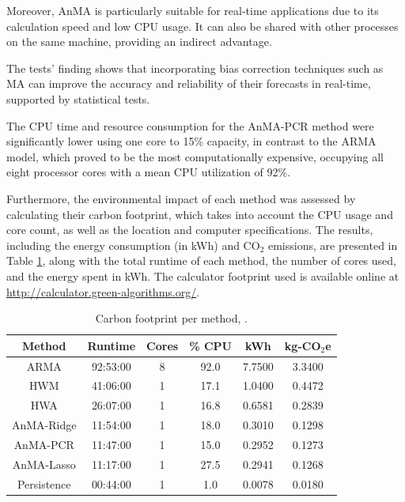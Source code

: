 Moreover, AnMA is particularly suitable for real-time applications due to its calculation speed and low CPU usage. It can also be shared with other processes on the same machine, providing an indirect advantage.

The tests' finding shows that incorporating bias correction techniques such as MA can improve the accuracy and reliability of their forecasts in real-time, supported by statistical tests.

The CPU time and resource consumption for the AnMA-PCR method were significantly lower using one core to 15\% capacity, in contrast to the ARMA model, which proved to be the most computationally expensive, occupying all eight processor cores with a mean CPU utilization of 92\%. 

Furthermore, the environmental impact of each method was assessed by calculating their carbon footprint, which takes into account the CPU usage and core count, as well as the location and computer specifications. The results, including the energy consumption (in kWh) and CO$_{2}$ emissions, are presented in Table \ref{tab:footprint}, along with the total runtime of each method, the number of cores used, and the energy spent in kWh. The calculator footprint used is available online at \url{http://calculator.green-algorithms.org/}.

\begin{table}[H]
\centering
\caption{Carbon footprint per method, \cite{Lannelongue2021}.}
\label{tab:footprint}
\footnotesize
\begin{tabular}{cccccc}
\hline
\hline
Method      & Runtime  & Cores & \% CPU & kWh    & kg-CO$_2$e  \\ \hline
ARMA        & 92:53:00 & 8     & 92.0   & 7.7500 & 3.3400   \\ 
HWM         & 41:06:00 & 1     & 17.1   & 1.0400 & 0.4472   \\ 
HWA         & 26:07:00 & 1     & 16.8   & 0.6581 & 0.2839   \\ 
AnMA-Ridge  & 11:54:00 & 1     & 18.0   & 0.3010 & 0.1298   \\ 
AnMA-PCR    & 11:47:00 & 1     & 15.0   & 0.2952 &  0.1273  \\ 
AnMA-Lasso  & 11:17:00 & 1     & 27.5   & 0.2941 & 0.1268   \\ 
Persistence & 00:44:00 & 1     &  1.0   & 0.0078 & 0.0180   \\  \hline \hline
\end{tabular}
\end{table}








